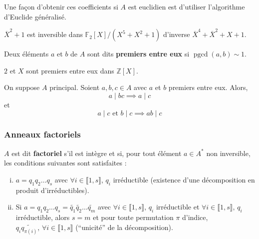 	\begin{remark}
		Une façon d'obtenir ces coefficients si $A$ est euclidien est d'utiliser l'algorithme d'Euclide généralisé.
	\end{remark}
	
		
	\begin{application}
		$\overline{X}^2+1$ est inversible dans $\mathbb{F}_2[X]/(X^5 + X^2 + 1)$ d'inverse $\overline{X}^4+\overline{X}^2+X+1$.
	\end{application}
	
	
	\begin{definition}
		Deux éléments $a$ et $b$ de $A$ sont dits \textbf{premiers entre eux} si $\operatorname{pgcd}(a,b) \sim 1$.
	\end{definition}
	
	\begin{example}
		$2$ et $X$ sont premiers entre eux dans $\mathbb{Z}[X]$.
	\end{example}
	
	\begin{lemma}[Gauss]
		On suppose $A$ principal. Soient $a, b, c \in A$ avec $a$ et $b$ premiers entre eux. Alors,
		\[ a \mid bc \implies a \mid c \]
		et
		\[ a \mid c \text{ et } b \mid c \implies ab \mid c \]
	\end{lemma}

	\subsubsection{Anneaux factoriels}
	
	
	\begin{definition}
		$A$ est dit \textbf{factoriel} s'il est intègre et si, pour tout élément $a \in A^*$ non inversible, les conditions suivantes sont satisfaites :
		\begin{enumerate}[(i)]
			\item \label{122-2} $a = q_1 q_2 \dots q_s$ avec $\forall i \in \llbracket 1, s \rrbracket, \, q_i$ irréductible (existence d'une décomposition en produit d'irréductibles).
			\item \label{122-3} Si $a = q_1 q_2 \dots q_s = \widetilde{q_1} \widetilde{q_2} \dots \widetilde{q_m}$ avec $\forall i \in \llbracket 1, s \rrbracket, \, q_i$ irréductible et $\forall i \in \llbracket 1, s \rrbracket, \, q_i$ irréductible, alors $s = m$ et pour toute permutation $\pi$ d'indice, $q_i \widetilde{q_{\pi(i)}}, \, \forall i \in \llbracket 1, s \rrbracket$ (``unicité'' de la décomposition).
		\end{enumerate}
	\end{definition}
	
